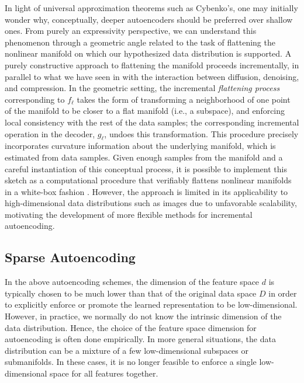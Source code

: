 \documentclass[../../book-main.tex]{subfiles}
\begin{document}
In light of universal approximation theorems such as Cybenko's, one
may initially wonder why, conceptually, deeper autoencoders should be preferred
over shallow ones.
From purely an expressivity perspective, we can understand this phenomenon
through a geometric angle related to the task of flattening the nonlinear
manifold on which our hypothesized data distribution is supported. A purely
constructive approach to flattening the manifold proceeds incrementally, in
parallel to what we have seen in
 with
the interaction between diffusion, denoising, and compression. In the geometric
setting, the incremental \textit{flattening process} corresponding to $f_{\ell}$
takes the form of transforming a neighborhood of one point of the manifold to be
closer to a flat manifold (i.e., a subspace), and enforcing local consistency
with the rest of the data samples; the corresponding incremental operation in
the decoder, $g_{\ell}$, undoes this transformation. This procedure precisely
incorporates curvature information about the underlying manifold, which is
estimated from data samples. Given enough samples from the manifold and
a careful instantiation of this conceptual process, it is possible to implement
this sketch as a computational procedure that verifiably flattens nonlinear
manifolds in a white-box fashion \cite{Psenka-JMLR24}. However, the approach is
limited in its applicability to high-dimensional data distributions such as
images due to unfavorable scalability, motivating the development of more
flexible methods for incremental autoencoding.

\subsection{Sparse Autoencoding}
In the above autoencoding schemes, the dimension of the feature space
$d$ is typically chosen to be much lower than that of the original data
space $D$ in order to explicitly enforce or promote the learned
representation to be low-dimensional. However, in practice, we
normally do not know the intrinsic dimension of the data
distribution. Hence, the choice of the feature space dimension for
autoencoding is often done empirically. In more general situations,
the data distribution can be a mixture of a few low-dimensional
subspaces or submanifolds. In these cases, it is no longer feasible
to enforce a single low-dimensional space for all features together.
\end{document}
